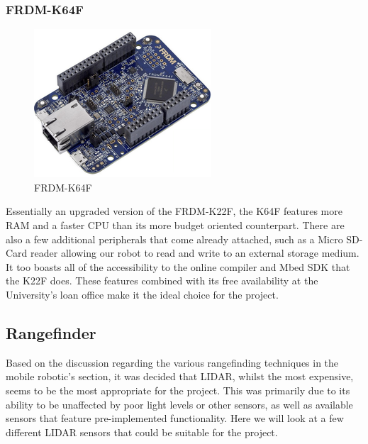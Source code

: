 					\subsubsection{FRDM-K64F}
					\begin{figure}[h]
						\centering
						\includegraphics[width=.3\linewidth]{ANALYSIS/k64f.png}
						\caption{FRDM-K64F}
						\label{fig:k64f}
					\end{figure}
					Essentially an upgraded version of the FRDM-K22F, the K64F features more RAM and a faster CPU than its more budget oriented counterpart. There are also a few additional peripherals that come already attached, such as a Micro SD-Card reader allowing our robot to read and write to an external storage medium. It too boasts all of the accessibility to the online compiler and Mbed SDK that the K22F does. These features combined with its free availability at the University's loan office make it the ideal choice for the project.
			
				\subsection{Rangefinder}
				Based on the discussion regarding the various rangefinding techniques in the mobile robotic's section, it was decided that LIDAR, whilst the most expensive, seems to be the most appropriate for the project. This was primarily due to its ability to be unaffected by poor light levels or other sensors, as well as available sensors that feature pre-implemented functionality. Here we will look at a few different LIDAR sensors that could be suitable for the project.
				
